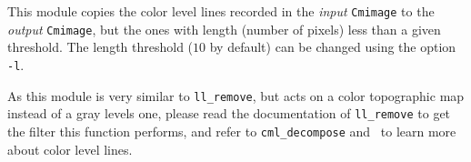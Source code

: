 This module copies the color level lines recorded in the 
{\em input} {\tt Cmimage} to the {\em output} {\tt Cmimage}, 
but the ones with length (number of pixels) less than a given threshold. 
The length threshold ($10$ by default) can be changed using the option
\verb+-l+.

As this module is very similar to {\tt ll\_remove}, but acts on a 
color topographic map instead of a 
gray levels one, please read the documentation of {\tt ll\_remove}
to get the filter this function performs, and refer to {\tt cml\_decompose} 
and~\cite{coll.froment:topographic} to learn more about color level lines.
